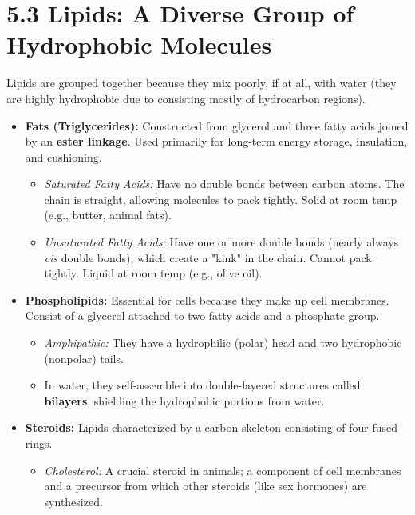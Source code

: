 \documentclass[11pt, a4paper]{article}
\begin{document}
\section*{5.3 Lipids: A Diverse Group of Hydrophobic Molecules}
Lipids are grouped together because they mix poorly, if at all, with water (they are highly hydrophobic due to consisting mostly of hydrocarbon regions).
\begin{itemize}
    \item \textbf{Fats (Triglycerides):} Constructed from glycerol and three fatty acids joined by an \textbf{ester linkage}. Used primarily for long-term energy storage, insulation, and cushioning.
    \begin{itemize}
        \item \textit{Saturated Fatty Acids:} Have no double bonds between carbon atoms. The chain is straight, allowing molecules to pack tightly. Solid at room temp (e.g., butter, animal fats).
        \item \textit{Unsaturated Fatty Acids:} Have one or more double bonds (nearly always \textit{cis} double bonds), which create a "kink" in the chain. Cannot pack tightly. Liquid at room temp (e.g., olive oil).
    \end{itemize}
    \item \textbf{Phospholipids:} Essential for cells because they make up cell membranes. Consist of a glycerol attached to two fatty acids and a phosphate group.
    \begin{itemize}
        \item \textit{Amphipathic:} They have a hydrophilic (polar) head and two hydrophobic (nonpolar) tails.
        \item In water, they self-assemble into double-layered structures called \textbf{bilayers}, shielding the hydrophobic portions from water.
    \end{itemize}
    \item \textbf{Steroids:} Lipids characterized by a carbon skeleton consisting of four fused rings.
    \begin{itemize}
        \item \textit{Cholesterol:} A crucial steroid in animals; a component of cell membranes and a precursor from which other steroids (like sex hormones) are synthesized.
    \end{itemize}
\end{itemize}
\end{document}
